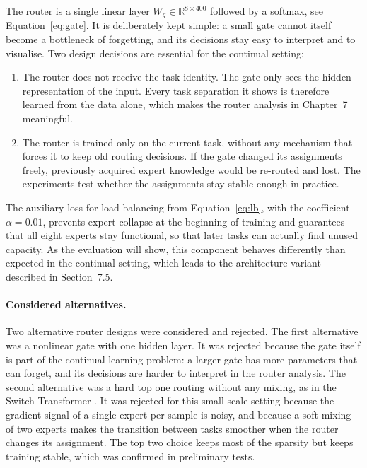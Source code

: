 The router is a single linear layer $W_g \in \mathbb{R}^{8 \times 400}$
followed by a softmax, see Equation~\eqref{eq:gate}. It is deliberately
kept simple: a small gate cannot itself become a bottleneck of forgetting,
and its decisions stay easy to interpret and to visualise. Two design
decisions are essential for the continual setting:

\begin{enumerate}[label=\textbf{D\arabic*.}, leftmargin=3em]
  \item The router does not receive the task identity. The gate only sees
        the hidden representation of the input. Every task separation it
        shows is therefore learned from the data alone, which makes the
        router analysis in Chapter~7 meaningful.
  \item The router is trained only on the current task, without any
        mechanism that forces it to keep old routing decisions. If the
        gate changed its assignments freely, previously acquired expert
        knowledge would be re-routed and lost. The experiments test whether
        the assignments stay stable enough in practice.
\end{enumerate}

The auxiliary loss for load balancing from Equation~\eqref{eq:lb}, with the
coefficient $\alpha = 0.01$, prevents expert collapse at the beginning of
training and guarantees that all eight experts stay functional, so that
later tasks can actually find unused capacity. As the evaluation will show,
this component behaves differently than expected in the continual setting,
which leads to the architecture variant described in Section~7.5.

\paragraph{Considered alternatives.} Two alternative router designs were
considered and rejected. The first alternative was a nonlinear gate with
one hidden layer. It was rejected because the gate itself is part of the
continual learning problem: a larger gate has more parameters that can
forget, and its decisions are harder to interpret in the router analysis.
The second alternative was a hard top one routing without any mixing,
as in the Switch Transformer \cite{fedus2022}. It was rejected for this
small scale setting because the gradient signal of a single expert per
sample is noisy, and because a soft mixing of two experts makes the
transition between tasks smoother when the router changes its assignment.
The top two choice keeps most of the sparsity but keeps training stable,
which was confirmed in preliminary tests.

